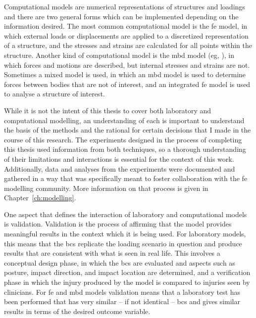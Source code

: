 Computational models are numerical representations of structures and loadings and there are two general forms which can be implemented depending on the information desired.
The most common computational model is the \acf{fe} model, in which external loads or displacements are applied to a discretized representation of a structure, and the stresses and strains are calculated for all points within the structure.
Another kind of computational model is the \ac{mbd} model (\ac{eg}, \citet{van_den_kroonenberg_dynamic_1995}), in which forces and motions are described, but internal stresses and strains are not.
Sometimes a mixed model is used, in which an \ac{mbd} model is used to determine forces between bodies that are not of interest, and an integrated \ac{fe} model is used to analyse a structure of interest.

While it is not the intent of this thesis to cover both laboratory and computational modelling, an understanding of each is important to understand the basis of the methods and the rational for certain decisions that I made in the course of this research.
The experiments designed in the process of completing this thesis used information from both techniques, so a thorough understanding of their limitations and interactions is essential for the context of this work.
Additionally, data and analyses from the experiments were documented and gathered in a way that was specifically meant to foster collaboration with the \ac{fe} modelling community.
More information on that process is given in Chapter~\ref{ch:modelling}.

One aspect that defines the interaction of laboratory and computational models is validation.
Validation is the process of affirming that the model provides meaningful results in the context which it is being used.
For laboratory models, this means that the \acfp{bc} replicate the loading scenario in question and produce results that are consistent with what is seen in real life.
This involves a conceptual design phase, in which the \acp{bc} are evaluated and aspects such as posture, impact direction, and impact location are determined, and a verification phase in which the injury produced by the model is compared to injuries seen by clinicians.
For \ac{fe} and \ac{mbd} models validation means that a laboratory test has been performed that has very similar -- if not identical -- \acp{bc} and gives similar results in terms of the desired outcome variable.

